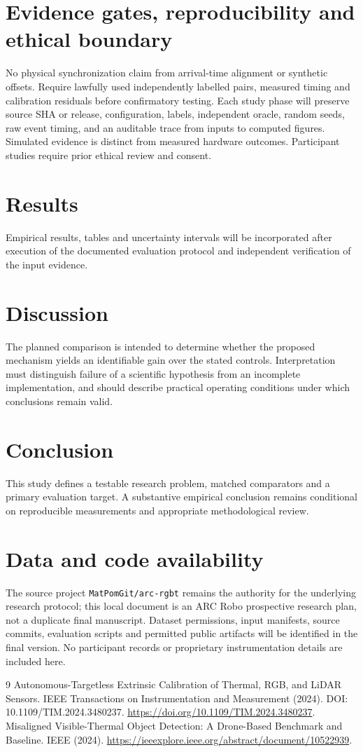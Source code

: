 \documentclass[11pt,a4paper]{article}
\begin{document}
\section{Evidence gates, reproducibility and ethical boundary}
No physical synchronization claim from arrival-time alignment or synthetic offsets. Require lawfully used independently labelled pairs, measured timing and calibration residuals before confirmatory testing. Each study phase will preserve source SHA or release, configuration, labels, independent oracle, random seeds, raw event timing, and an auditable trace from inputs to computed figures. Simulated evidence is distinct from measured hardware outcomes. Participant studies require prior ethical review and consent.

\section{Results}
Empirical results, tables and uncertainty intervals will be incorporated after execution of the documented evaluation protocol and independent verification of the input evidence.

\section{Discussion}
The planned comparison is intended to determine whether the proposed mechanism yields an identifiable gain over the stated controls. Interpretation must distinguish failure of a scientific hypothesis from an incomplete implementation, and should describe practical operating conditions under which conclusions remain valid.

\section{Conclusion}
This study defines a testable research problem, matched comparators and a primary evaluation target. A substantive empirical conclusion remains conditional on reproducible measurements and appropriate methodological review.

\section{Data and code availability}
The source project \texttt{MatPomGit/arc-rgbt} remains the authority for the underlying research protocol; this local document is an ARC Robo prospective research plan, not a duplicate final manuscript. Dataset permissions, input manifests, source commits, evaluation scripts and permitted public artifacts will be identified in the final version. No participant records or proprietary instrumentation details are included here.
\begin{thebibliography}{9}
 Autonomous-Targetless Extrinsic Calibration of Thermal, RGB, and LiDAR Sensors. IEEE Transactions on Instrumentation and Measurement (2024). DOI: 10.1109/TIM.2024.3480237. \url{https://doi.org/10.1109/TIM.2024.3480237}.
 Misaligned Visible-Thermal Object Detection: A Drone-Based Benchmark and Baseline. IEEE (2024). \url{https://ieeexplore.ieee.org/abstract/document/10522939}.
\end{thebibliography}
\end{document}
